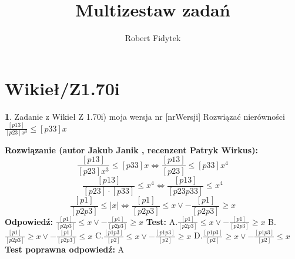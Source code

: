 \documentclass[12pt, a4paper]{article}
\title{Multizestaw zadań}
\author{Robert Fidytek}
\date{}
\theoremstyle{definition} %
\newtheorem{zad}{}
\newcommand{\kategoria}[1]{\section{#1}} %
\newcommand{\zadStart}[1]{\begin{zad}#1\newline} %
\newcommand{\zadStop}{\end{zad}}   %
\newcommand{\rozwStart}[2]{\noindent \textbf{Rozwiązanie (autor #1 , recenzent #2): }\newline} %
\newcommand{\rozwStop}{\newline}                                            %
\newcommand{\odpStart}{\noindent \textbf{Odpowiedź:}\newline}    %
\newcommand{\odpStop}{\newline}                                             %
\newcommand{\testStart}{\noindent \textbf{Test:}\newline} %
\newcommand{\testStop}{\newline} %
\newcommand{\kluczStart}{\noindent \textbf{Test poprawna odpowiedź:}\newline} %
\newcommand{\kluczStop}{\newline} %
\begin{document}
\maketitle


\kategoria{Wikieł/Z1.70i}
\zadStart{Zadanie z Wikieł Z 1.70i) moja wersja nr [nrWersji]}
Rozwiązać nierówności $\frac{[p13]}{[p23]x^3} \leq [p33]x$
\zadStop
\rozwStart{Jakub Janik}{Patryk Wirkus}
$$\frac{[p13]}{[p23]x^3} \leq [p33]x \Leftrightarrow \frac{[p13]}{[p23]} \leq [p33]x^4$$
$$\frac{[p13]}{[p23]\cdot[p33]} \leq x^4 \Leftrightarrow \frac{[p13]}{[p23p33]} \leq x^4$$
$$\frac{[p1]}{[p2p3]} \leq |x| \Leftrightarrow \frac{[p1]}{[p2p3]} \leq x \lor -\frac{[p1]}{[p2p3]} \geq x$$
\rozwStop
\odpStart
$\frac{[p1]}{[p2p3]} \leq x \lor -\frac{[p1]}{[p2p3]} \geq x$
\odpStop
\testStart
A.$\frac{[p1]}{[p2p3]} \leq x \lor -\frac{[p1]}{[p2p3]} \geq x$
B.$\frac{[p1]}{[p2p3]} \geq x \lor -\frac{[p1]}{[p2p3]} \leq x$
C.$\frac{[p1p3]}{[p2]} \leq x \lor -\frac{[p1p3]}{[p2]} \geq x$
D.$\frac{[p1p3]}{[p2]} \geq x \lor -\frac{[p1p3]}{[p2]} \leq x$
\testStop
\kluczStart
A
\kluczStop
\end{document}
